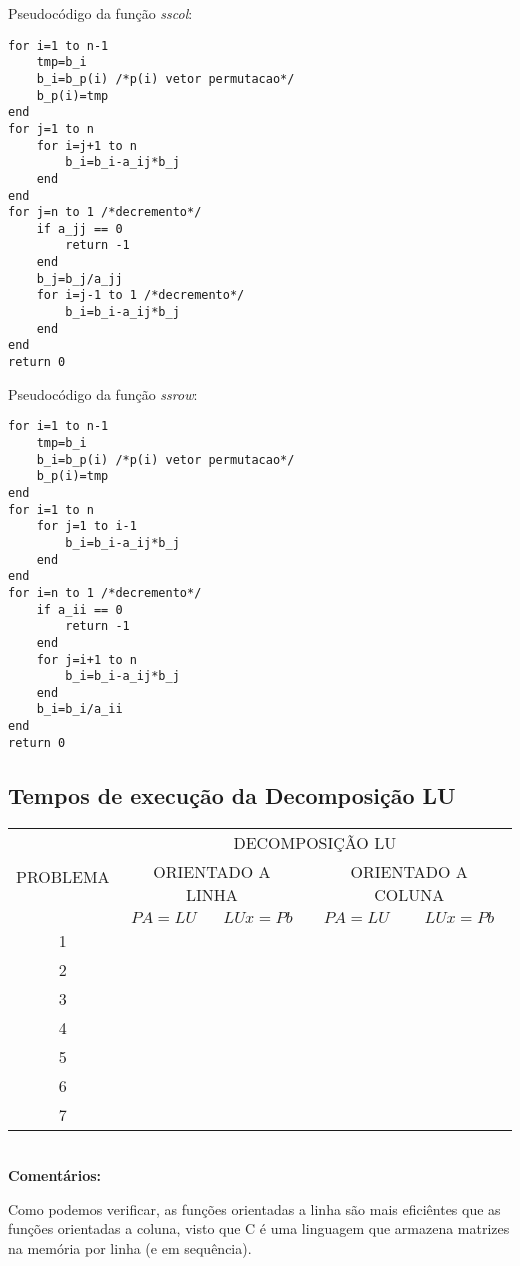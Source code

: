 \documentclass[a4paper,11pt]{article}
\begin{document}
Pseudocódigo da função {\it sscol}:
\begin{lstlisting}
for i=1 to n-1
	tmp=b_i
	b_i=b_p(i) /*p(i) vetor permutacao*/
	b_p(i)=tmp
end
for j=1 to n
	for i=j+1 to n
		b_i=b_i-a_ij*b_j
	end
end
for j=n to 1 /*decremento*/
	if a_jj == 0
		return -1
	end
	b_j=b_j/a_jj
	for i=j-1 to 1 /*decremento*/
		b_i=b_i-a_ij*b_j
	end
end
return 0
\end{lstlisting}
Pseudocódigo da função {\it ssrow}:
\begin{lstlisting}
for i=1 to n-1
	tmp=b_i
	b_i=b_p(i) /*p(i) vetor permutacao*/
	b_p(i)=tmp
end
for i=1 to n
	for j=1 to i-1
		b_i=b_i-a_ij*b_j
	end
end
for i=n to 1 /*decremento*/
	if a_ii == 0
		return -1
	end
	for j=i+1 to n
		b_i=b_i-a_ij*b_j
	end
	b_i=b_i/a_ii
end
return 0
\end{lstlisting}

\subsection{Tempos de execução da Decomposição LU}

\begin{table}[htb]
	\label{tab:inters}
	\large
	\centering
	\begin{tabular}{|c|c|c||c|c|}
		\hline
		\multirow{3}{*}{PROBLEMA} & \multicolumn{4}{|c|}{DECOMPOSIÇÃO LU} \\
		\cline{2-5}
		& \multicolumn{2}{|c||}{ORIENTADO A LINHA} & \multicolumn{2}{|c|}{ORIENTADO A COLUNA} \\
		\cline{2-5}
		& $PA=LU$ & $LUx=Pb$ & $PA=LU$ & $LUx=Pb$ \\
		\hline
		\hline
		1 &  &  &  &\\
		2 &  &  &  &\\
		3 &  &  &  &\\
		4 &  &  &  &\\
		5 &  &  &  &\\
		6 &  &  &  &\\
		7 &  &  &  &\\
		\hline
	\end{tabular}
\end{table}
\  \\
{\bf Comentários:}

Como podemos verificar, as funções orientadas a linha são mais eficiêntes que as funções orientadas a coluna, visto que C é uma linguagem que armazena matrizes na memória por linha (e em sequência). 
\end{document}
